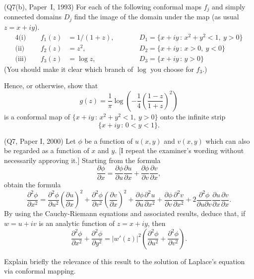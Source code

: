 \begin{question} (Q7(b), Paper~I, 1993)
For each of the following conformal
maps $f_{j}$ and simply connected 
domains $D_{j}$ find the image of the
domain under the map (as usual $z=x+iy$).
\begin{alignat*}{4}
\text{(i)}&\ \ &f_{1}(z)&=1/(1+z),&&\qquad 
D_{1}=\{x+iy\,:\, x^{2}+y^{2}<1,\ y>0\}\\
\text{(ii)}&\ \ &f_{2}(z)&=z^{2},&&\qquad 
D_{2}=\{x+iy\,:\, x>0,\ y<0\}\\
\text{(iii)}&\ \ &f_{3}(z)&=\log z,&&\qquad 
D_{3}=\{x+iy\,:\, y>0\}
\end{alignat*}
(You should make it clear which branch of $\log$ you
choose for $f_{3}$.)

Hence, or otherwise, show that
\[g(z)=\frac{1}{\pi}\log\left(
-\frac{1}{4}\left(\frac{1-z}{1+z}\right)^{2}
\right)\]
is a conformal map of $\{x+iy\,:\, x^{2}+y^{2}<1,\ y>0\}$
onto the infinite strip
\[\{x+iy\,:\, 0<y<1\}.\]
\end{question}
\begin{question} (Q7, Paper I, 2000) Let $\phi$ be a function
of $u(x,y)$ and $v(x,y)$ which can also be regarded
as a function of $x$ and $y$. [I repeat the examiner's wording
without necessarily approving it.] Starting from the formula
\[\frac{\partial \phi}{\partial x}
=\frac{\partial \phi}{\partial u}\frac{\partial u}{\partial x}
+\frac{\partial \phi}{\partial v}\frac{\partial v}{\partial x},\]
obtain the formula
\[\frac{\partial^{2} \phi}{\partial x^{2}}
=\frac{\partial^{2} \phi}{\partial u^{2}}
\left(\frac{\partial u}{\partial x}\right)^{2}
+\frac{\partial^{2} \phi}{\partial v^{2}}
\left(\frac{\partial v}{\partial x}\right)^{2}
+\frac{\partial \phi}{\partial u}
\frac{\partial^{2} u}{\partial x^{2}}
+\frac{\partial \phi}{\partial v}
\frac{\partial^{2} v}{\partial x^{2}}
+2\frac{\partial^{2} \phi}{\partial u \partial v}
\frac{\partial u}{\partial x}\frac{\partial v}{\partial x}.\]
By using the Cauchy-Riemann equations and associated
results, deduce that, if $w=u+iv$ is an analytic function of
$z=x+iy$, then
\[\frac{\partial^{2} \phi}{\partial x^{2}}
+\frac{\partial^{2} \phi}{\partial y^{2}}
=|w'(z)|^{2}
\left(
\frac{\partial^{2} \phi}{\partial u^{2}}
+\frac{\partial^{2} \phi}{\partial v^{2}}
\right).
\]

Explain briefly the relevance of this result to the solution
of Laplace's equation via conformal mapping.
\end{question}
